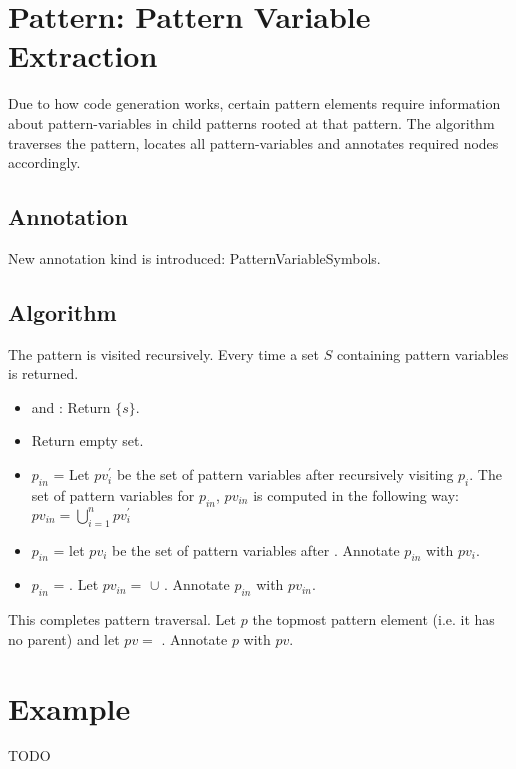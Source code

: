 \section{Pattern: Pattern Variable Extraction}

Due to how code generation works, certain pattern elements require information about pattern-variables in child patterns rooted at that pattern. The algorithm traverses the pattern, locates all pattern-variables and annotates required nodes accordingly.
\subsection{Annotation}

New annotation kind is introduced: PatternVariableSymbols.

\subsection{Algorithm}

The pattern is visited recursively. Every time a set $S$ containing pattern variables is returned.

\begin{itemize}
\item 
\Nt and \BuiltInPattern: Return $\{ s \}$.

\item
\LiteralPattern Return empty set.

\item $p_{in}$ = \PatternSequence  Let $pv_i^{\prime}$ be the set of pattern variables after recursively visiting $p_i$. The set of pattern variables for $p_{in}$, $pv_{in}$ is computed in the following way: $pv_{in} = \bigcup_{i=1}^{n}pv_i^{\prime}$

\item $p_{in}$ = \Repeat let $pv_i$ be the set of pattern variables after  . Annotate $p_{in}$ with $pv_i$.

\item $p_{in}$ = \InHolePattern. Let $pv_{in}=$  $\cup$ . Annotate $p_{in}$ with $pv_{in}$.
\end{itemize}

This completes pattern traversal. Let $p$ the topmost pattern element (i.e. it has no parent) and let $pv=$ . Annotate $p$ with $pv$.

\section{Example}
TODO
